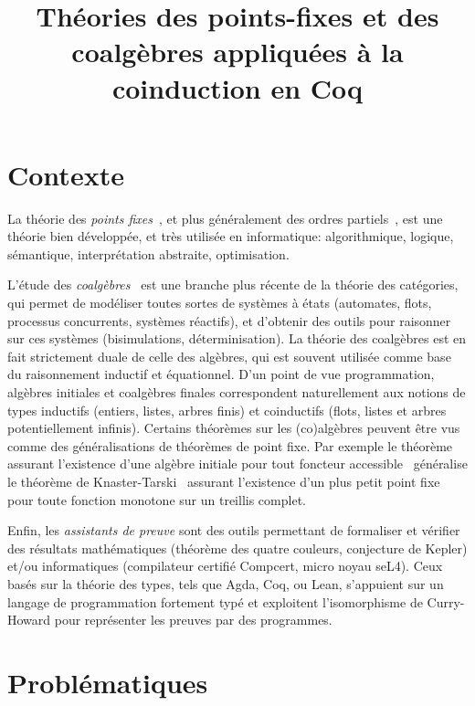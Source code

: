 \documentclass[a4paper,11pt]{article}
\title{Théories des points-fixes et des coalgèbres appliquées à la coinduction en Coq}
\begin{document}
\maketitle

\section{Contexte}

La théorie des \emph{points fixes}~\cite{BIR67a}, et plus généralement des ordres partiels~\cite{DaveyPriestley90}, est une théorie bien développée, et très utilisée en informatique: algorithmique, logique, sémantique, interprétation abstraite, optimisation.

L'étude des \emph{coalgèbres}~\cite{jacobs:book} est une branche plus récente de la théorie des catégories, qui permet de modéliser toutes sortes de systèmes à états (automates, flots, processus concurrents, systèmes réactifs), et d'obtenir des outils pour raisonner sur ces systèmes (bisimulations, déterminisation).
%
La théorie des coalgèbres est en fait strictement duale de celle des algèbres, qui est souvent utilisée comme base du raisonnement inductif et équationnel. D'un point de vue programmation, algèbres initiales et coalgèbres finales correspondent naturellement aux notions de types inductifs (entiers, listes, arbres finis) et coinductifs (flots, listes et arbres potentiellement infinis).
%
Certains théorèmes sur les (co)algèbres peuvent être vus comme des généralisations de théorèmes de point fixe. Par exemple le théorème assurant l'existence d'une algèbre initiale pour tout foncteur accessible~\cite{adamek1974free} généralise le théorème de Knaster-Tarski~\cite{Kna28,Tarski55} assurant l'existence d'un plus petit point fixe pour toute fonction monotone sur un treillis complet.

Enfin, les \emph{assistants de preuve} sont des outils permettant de formaliser et vérifier des résultats mathématiques (théorème des quatre couleurs, conjecture de Kepler) et/ou informatiques (compilateur certifié Compcert, micro noyau seL4). Ceux basés sur la théorie des types, tels que Agda, Coq, ou Lean, s'appuient sur un langage de programmation fortement typé et exploitent l'isomorphisme de Curry-Howard pour représenter les preuves par des programmes.

\section{Problématiques}
\end{document}

